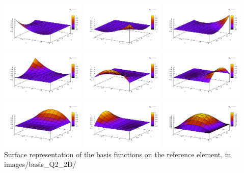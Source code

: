 \begin{center}
\includegraphics[width=4cm]{images/basis_Q2_2D/N1}
\includegraphics[width=4cm]{images/basis_Q2_2D/N2}
\includegraphics[width=4cm]{images/basis_Q2_2D/N3}\\
\includegraphics[width=4cm]{images/basis_Q2_2D/N4}
\includegraphics[width=4cm]{images/basis_Q2_2D/N5}
\includegraphics[width=4cm]{images/basis_Q2_2D/N6}\\
\includegraphics[width=4cm]{images/basis_Q2_2D/N7}
\includegraphics[width=4cm]{images/basis_Q2_2D/N8}
\includegraphics[width=4cm]{images/basis_Q2_2D/N9}\\
{\captionfont Surface representation of the basis functions on the reference element.
{\color{gray} in images/basis\_Q2\_2D/ }}
\end{center}
